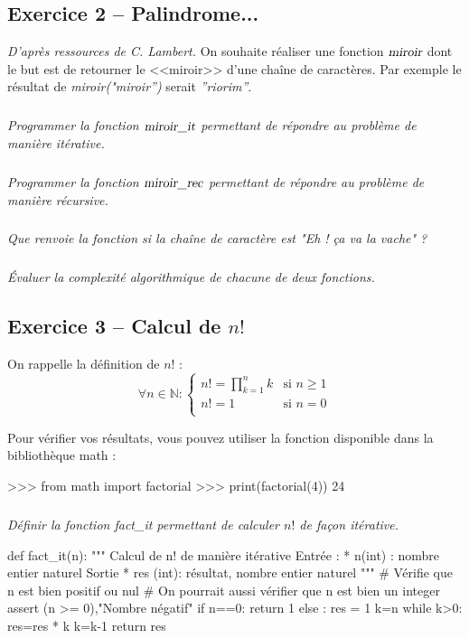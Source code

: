 \documentclass[10pt,fleqn]{article} %
\begin{document}
\begin{multicols}{2}
\subsection*{Exercice 2 -- Palindrome...}
\textit{D'après ressources de C. Lambert.}
\setcounter{subparagraph}{0}
On souhaite réaliser une fonction $\textsl{miroir}$ dont le but est de retourner le <<miroir>> d'une chaîne de caractères. Par exemple le résultat de \textsl{miroir("miroir'')} serait \textsl{''riorim''}.

\subparagraph{}
\textit{Programmer la fonction $\textsl{miroir\_it}$ permettant de répondre au problème de manière itérative.}


\subparagraph{}
\textit{Programmer la fonction $\textsl{miroir\_rec}$ permettant de répondre au problème de manière récursive.}


\subparagraph{}
\textit{Que renvoie la fonction si la chaîne de caractère est "Eh ! ça va la vache" ?}
 
 \subparagraph{}
\textit{Évaluer la complexité algorithmique de chacune de deux fonctions.}

 
\subsection*{Exercice 3 -- Calcul de $n!$}
\setcounter{subparagraph}{0}

\noindent 
On rappelle la définition de $n!$ :
$$
\forall n\in \mathbb{N} : \left\{ \begin{array}{ll}
n!= \prod_{k=1}^n k & \text{si } n\geq1 \\
n!= 1 & \text{si } n=0 \\
\end{array} \right.
$$

\begin{rem}
Pour vérifier vos résultats, vous pouvez utiliser la fonction disponible dans la bibliothèque \textsf{math} : 
\begin{python}
>>> from math import factorial
>>> print(factorial(4)) 
       24
\end{python}
\end{rem}
\subparagraph{}
\textit{Définir la fonction \textsl{fact\_it} permettant de calculer $n!$ de façon itérative.}
\ifprof
\begin{corrige}
\begin{python}
def fact_it(n):
    """
    Calcul de n! de manière itérative
    Entrée : 
     * n(int) : nombre entier naturel
    Sortie 
     * res (int): résultat, nombre entier naturel
    """
    # Vérifie que n est bien positif ou nul
    # On pourrait aussi vérifier que n est bien un integer
    assert (n >= 0),"Nombre négatif" 
    if n==0:
        return 1
    else :
        res = 1
        k=n
        while k>0:
            res=res * k
            k=k-1
        return res
\end{python}
\end{corrige}
\else
\fi



\end{multicols}
\end{document}
